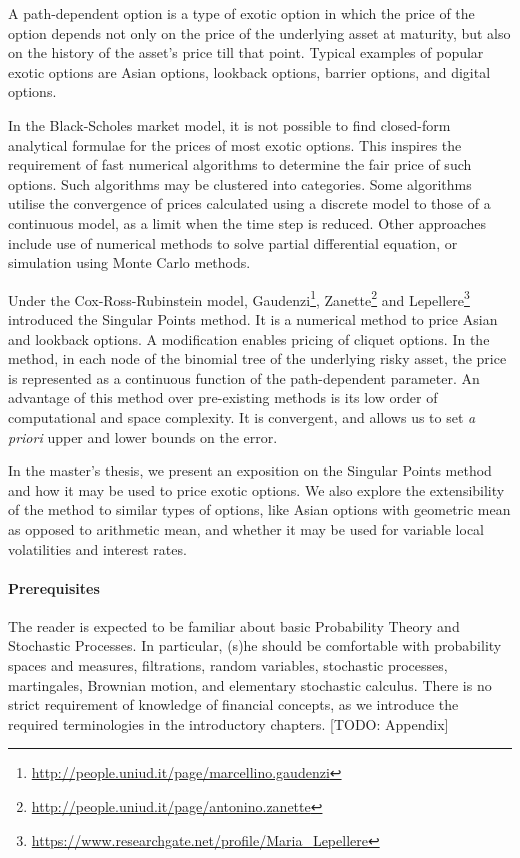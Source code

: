 
A path-dependent option is a type of exotic option in which the price of the option depends not only on the price of the underlying asset at maturity, but also on the history of the asset's price till that point. Typical examples of popular exotic options are Asian options, lookback options, barrier options, and digital options.

In the Black-Scholes market model, it is not possible to find closed-form analytical formulae for the prices of most exotic options. This inspires the requirement of fast numerical algorithms to determine the fair price of such options. Such algorithms may be clustered into categories. Some algorithms utilise the convergence of prices calculated using a discrete model to those of a continuous model, as a limit when the time step is reduced. Other approaches include use of numerical methods to solve partial differential equation, or simulation using Monte Carlo methods.

Under the Cox-Ross-Rubinstein model, Gaudenzi\footnote{\url{http://people.uniud.it/page/marcellino.gaudenzi}}, Zanette\footnote{\url{http://people.uniud.it/page/antonino.zanette}} and Lepellere\footnote{\url{https://www.researchgate.net/profile/Maria_Lepellere}} introduced the Singular Points method. It is a numerical method to price Asian and lookback options. A modification enables pricing of cliquet options. In the method, in each node of the binomial tree of the underlying risky asset, the price is represented as a continuous function of the path-dependent parameter. An advantage of this method over pre-existing methods is its low order of computational and space complexity. It is convergent, and allows us to set \emph{a priori} upper and lower bounds on the error.

In the master's thesis, we present an exposition on the Singular Points method and how it may be used to price exotic options. We also explore the extensibility of the method to similar types of options, like Asian options with geometric mean as opposed to arithmetic mean, and whether it may be used for variable local volatilities and interest rates.


\paragraph{Prerequisites}
The reader is expected to be familiar about basic Probability Theory and Stochastic Processes. In particular, (s)he should be comfortable with probability spaces and measures, filtrations, random variables, stochastic processes, martingales, Brownian motion, and elementary stochastic calculus. There is no strict requirement of knowledge of financial concepts, as we introduce the required terminologies in the introductory chapters. [TODO: Appendix]


